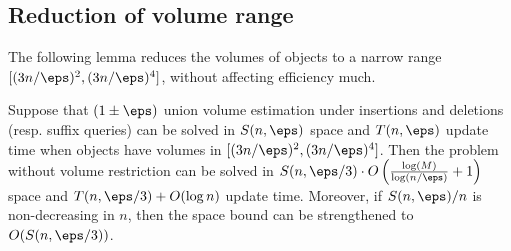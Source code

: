 \subsection{Reduction of volume range}
The following lemma reduces the volumes of objects to a narrow range $[(3n/\eps)^2, (3n/\eps)^4]$, without affecting efficiency much.
\begin{lemma}
    \label{lem:reduce-aspect-ratio}
    Suppose that $(1 \pm \eps)$ union volume estimation under insertions and deletions (resp. suffix queries) can be solved in $S(n,\eps)$ space and $T(n,\eps)$ update time when objects have volumes in $[(3n/\eps)^2, (3n/\eps)^4]$. Then the problem without volume restriction can be solved in $S(n,\eps/3) \cdot O\left(\frac{\log(M)}{\log(n/\eps)} + 1\right)$ space and $T(n,\eps/3) + O(\log n)$ update time. Moreover, if $S(n,\eps)/n$ is non-decreasing in $n$, then the space bound can be strengthened to $O(S(n,\eps/3))$.
\end{lemma}
%

